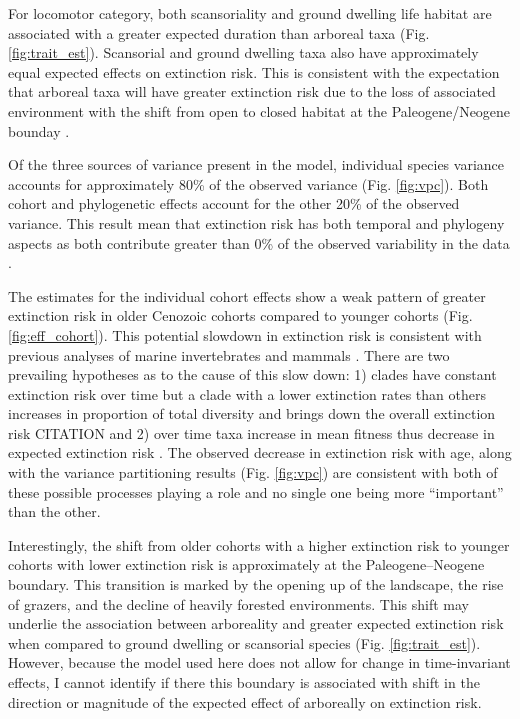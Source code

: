 \documentclass[12pt]{article}
\begin{document}
For locomotor category, both scansoriality and ground dwelling life habitat are associated with a greater expected duration than arboreal taxa (Fig. \ref{fig:trait_est}). Scansorial and ground dwelling taxa also have approximately equal expected effects on extinction risk.  This is consistent with the expectation that arboreal taxa will have greater extinction risk due to the loss of associated environment with the shift from open to closed habitat at the Paleogene/Neogene bounday \cite{Blois2009}.

Of the three sources of variance present in the model, individual species variance accounts for approximately 80\% of the observed variance (Fig. \ref{fig:vpc}). Both cohort and phylogenetic effects account for the other 20\% of the observed variance. This result mean that extinction risk has both temporal and phylogeny aspects as both contribute greater than 0\% of the observed variability in the data \cite{Housworth2004}.

The estimates for the individual cohort effects show a weak pattern of greater extinction risk in older Cenozoic cohorts compared to younger cohorts (Fig. \ref{fig:eff_cohort}). This potential slowdown in extinction risk is consistent with previous analyses of marine invertebrates \cite{Raup1982a,Foote2003} and mammals \cite{Alroy2010c,Alroy2000g}. There are two prevailing hypotheses as to the cause of this slow down: 1) clades have constant extinction risk over time but a clade with a lower extinction rates than others increases in proportion of total diversity and brings down the overall extinction risk CITATION and 2) over time taxa increase in mean fitness thus decrease in expected extinction risk \cite{Raup1982a}. The observed decrease in extinction risk with age, along with the variance partitioning results (Fig. \ref{fig:vpc}) are consistent with both of these possible processes playing a role and no single one being more ``important'' than the other.

Interestingly, the shift from older cohorts with a higher extinction risk to younger cohorts with lower extinction risk is approximately at the Paleogene--Neogene boundary. This transition is marked by the opening up of the landscape, the rise of grazers, and the decline of heavily forested environments. This shift may underlie the association between arboreality and greater expected extinction risk when compared to ground dwelling or scansorial species (Fig. \ref{fig:trait_est}). However, because the model used here does not allow for change in time-invariant effects, I cannot identify if there this boundary is associated with shift in the direction or magnitude of the expected effect of arboreally on extinction risk.
\end{document}
